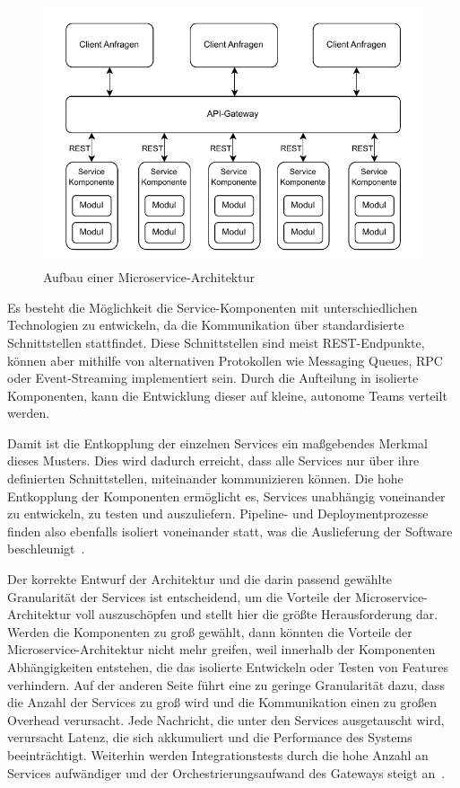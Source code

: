 \documentclass[acmtog]{acmart}
\begin{document}
\begin{figure}[!h]
  \centering
  \includegraphics[width=\linewidth]{images/microservices/microservices}
  \caption{Aufbau einer Microservice-Architektur}
  \label{fig:microservices}
\end{figure}

Es besteht die Möglichkeit die Service-Komponenten mit unterschiedlichen Technologien zu entwickeln, da die Kommunikation über standardisierte Schnittstellen stattfindet.
Diese Schnittstellen sind meist REST-Endpunkte, können aber mithilfe von alternativen Protokollen wie Messaging Queues, RPC oder Event-Streaming implementiert sein.
Durch die Aufteilung in isolierte Komponenten, kann die Entwicklung dieser auf kleine, autonome Teams verteilt werden.

Damit ist die Entkopplung der einzelnen Services ein maßgebendes Merkmal dieses Musters.
Dies wird dadurch erreicht, dass alle Services nur über ihre definierten Schnittstellen, miteinander kommunizieren können.
Die hohe Entkopplung der Komponenten ermöglicht es, Services unabhängig voneinander zu entwickeln, zu testen und auszuliefern.
Pipeline- und Deploymentprozesse finden also ebenfalls isoliert voneinander statt, was die Auslieferung der Software beschleunigt~\cite[27]{architecturePatterns}.

Der korrekte Entwurf der Architektur und die darin passend gewählte Granularität der Services ist entscheidend, um die Vorteile der Microservice-Architektur voll auszuschöpfen und stellt hier die größte Herausforderung dar.
Werden die Komponenten zu groß gewählt, dann könnten die Vorteile der Microservice-Architektur nicht mehr greifen, weil innerhalb der Komponenten Abhängigkeiten entstehen, die das isolierte Entwickeln oder Testen von Features verhindern.
Auf der anderen Seite führt eine zu geringe Granularität dazu, dass die Anzahl der Services zu groß wird und die Kommunikation einen zu großen Overhead verursacht.
Jede Nachricht, die unter den Services ausgetauscht wird, verursacht Latenz, die sich akkumuliert und die Performance des Systems beeinträchtigt.
Weiterhin werden Integrationstests durch die hohe Anzahl an Services aufwändiger und der Orchestrierungsaufwand des Gateways steigt an~\cite[32]{architecturePatterns}.
\end{document}
